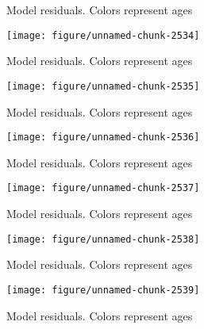 \documentclass[a4paper]{article}\usepackage{graphicx, color}
\makeatletter
\def\maxwidth{ %
  \ifdim\Gin@nat@width>\linewidth
    \linewidth
  \else
    \Gin@nat@width
  \fi
}
\newenvironment{knitrout}{}{} %
\makeatother
\begin{document}
\begin{knitrout}
\begin{figure}[H]
\caption[Model residuals]{Model residuals. Colors represent ages\label{fig:unnamed-chunk-2533}}
\end{figure}
\begin{figure}[H]


{\centering \texttt{[image: figure/unnamed-chunk-2534]} 

}

\caption[Model residuals]{Model residuals. Colors represent ages\label{fig:unnamed-chunk-2534}}
\end{figure}
\begin{figure}[H]


{\centering \texttt{[image: figure/unnamed-chunk-2535]} 

}

\caption[Model residuals]{Model residuals. Colors represent ages\label{fig:unnamed-chunk-2535}}
\end{figure}
\begin{figure}[H]


{\centering \texttt{[image: figure/unnamed-chunk-2536]} 

}

\caption[Model residuals]{Model residuals. Colors represent ages\label{fig:unnamed-chunk-2536}}
\end{figure}
\begin{figure}[H]


{\centering \texttt{[image: figure/unnamed-chunk-2537]} 

}

\caption[Model residuals]{Model residuals. Colors represent ages\label{fig:unnamed-chunk-2537}}
\end{figure}
\begin{figure}[H]


{\centering \texttt{[image: figure/unnamed-chunk-2538]} 

}

\caption[Model residuals]{Model residuals. Colors represent ages\label{fig:unnamed-chunk-2538}}
\end{figure}
\begin{figure}[H]


{\centering \texttt{[image: figure/unnamed-chunk-2539]} 

}

\caption[Model residuals]{Model residuals. Colors represent ages\label{fig:unnamed-chunk-2539}}
\end{figure}
\begin{figure}[H]



\end{figure}
\end{knitrout}
\end{document}
